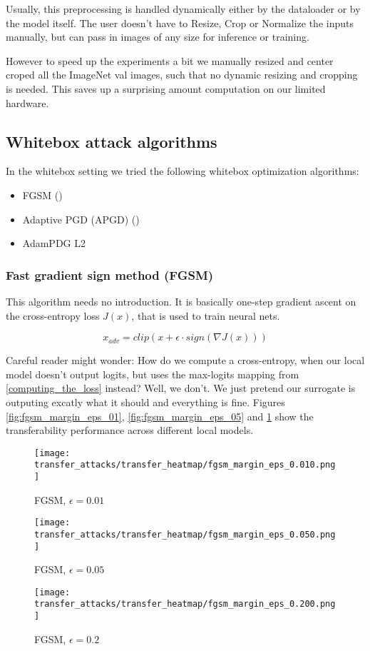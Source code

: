 Usually, this preprocessing is handled dynamically either by the dataloader or by the model itself. The user doesn't have to Resize, Crop or Normalize the inputs manually, but can pass in images of any size for inference or training.

However to speed up the experiments a bit we manually resized and center croped all the ImageNet val images, such that no dynamic resizing and cropping is needed. This saves up a surprising amount computation on our limited hardware.

\subsection{Whitebox attack algorithms}
In the whitebox setting we tried the following whitebox optimization algorithms:

\begin{itemize}
    \item FGSM (\cite{goodfellow2015explaining})
    \item Adaptive PGD (APGD) (\cite{croce2020reliable})
    \item AdamPDG L2
\end{itemize}


\subsubsection{Fast gradient sign method (FGSM)}
This algorithm needs no introduction.
It is basically one-step gradient ascent on the cross-entropy loss $J(x)$, that is used to train neural nets. 

$$x_{adv} = clip(x + \epsilon \cdot sign(\nabla J(x)))$$


Careful reader might wonder: How do we compute a cross-entropy, when our local model doesn't output logits, but uses the max-logits mapping from \ref{computing_the_loss} instead? Well, we don't. We just pretend our surrogate is outputing excatly what it should and everything is fine. Figures \ref{fig:fgsm_margin_eps_01}, \ref{fig:fgsm_margin_eps_05} and \ref{fig:fgsm_margin_eps_20} show the transferability performance across different local models.

\begin{figure}[!htb]
  \texttt{[image: transfer\_attacks/transfer\_heatmap/fgsm\_margin\_eps\_0.010.png]}
  \caption{FGSM, $\epsilon = 0.01$}\label{fig:fgsm_margin_eps_01}
\endminipage\hfill
{}
  \texttt{[image: transfer\_attacks/transfer\_heatmap/fgsm\_margin\_eps\_0.050.png]}
  \caption{FGSM, $\epsilon = 0.05$}\label{fig:fgsm_margin_eps_05}
\endminipage\hfill
{}%
  \texttt{[image: transfer\_attacks/transfer\_heatmap/fgsm\_margin\_eps\_0.200.png]}
  \caption{FGSM, $\epsilon = 0.2$}\label{fig:fgsm_margin_eps_20}
\endminipage
\end{figure}


